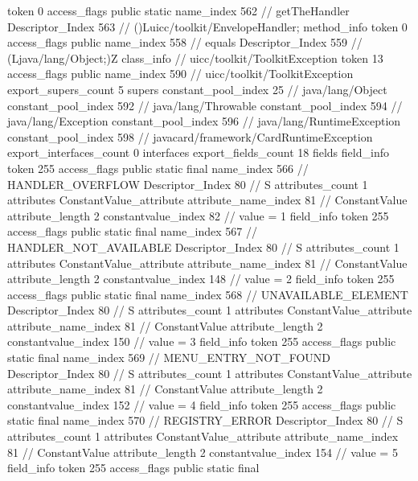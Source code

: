 {{{{{					token	0
					access_flags	public static
					name_index	562		// getTheHandler
					Descriptor_Index	563		// ()Luicc/toolkit/EnvelopeHandler;
				}
				method_info {
					token	0
					access_flags	public
					name_index	558		// equals
					Descriptor_Index	559		// (Ljava/lang/Object;)Z
				}
			}
		}
		class_info {		// uicc/toolkit/ToolkitException
			token	13
			access_flags	public
			name_index	590		// uicc/toolkit/ToolkitException
			export_supers_count	5
			supers {
				constant_pool_index	25		// java/lang/Object
				constant_pool_index	592		// java/lang/Throwable
				constant_pool_index	594		// java/lang/Exception
				constant_pool_index	596		// java/lang/RuntimeException
				constant_pool_index	598		// javacard/framework/CardRuntimeException
			}
			export_interfaces_count	0
			interfaces {
			}
			export_fields_count	18
			fields {
			field_info {
				token	255
				access_flags	public static final
				name_index	566		// HANDLER_OVERFLOW
				Descriptor_Index	80		// S
				attributes_count	1
				attributes {
				ConstantValue_attribute {
					attribute_name_index	81		// ConstantValue
					attribute_length	2
					constantvalue_index	82		// value = 1
				}
				}
			}
			field_info {
				token	255
				access_flags	public static final
				name_index	567		// HANDLER_NOT_AVAILABLE
				Descriptor_Index	80		// S
				attributes_count	1
				attributes {
				ConstantValue_attribute {
					attribute_name_index	81		// ConstantValue
					attribute_length	2
					constantvalue_index	148		// value = 2
				}
				}
			}
			field_info {
				token	255
				access_flags	public static final
				name_index	568		// UNAVAILABLE_ELEMENT
				Descriptor_Index	80		// S
				attributes_count	1
				attributes {
				ConstantValue_attribute {
					attribute_name_index	81		// ConstantValue
					attribute_length	2
					constantvalue_index	150		// value = 3
				}
				}
			}
			field_info {
				token	255
				access_flags	public static final
				name_index	569		// MENU_ENTRY_NOT_FOUND
				Descriptor_Index	80		// S
				attributes_count	1
				attributes {
				ConstantValue_attribute {
					attribute_name_index	81		// ConstantValue
					attribute_length	2
					constantvalue_index	152		// value = 4
				}
				}
			}
			field_info {
				token	255
				access_flags	public static final
				name_index	570		// REGISTRY_ERROR
				Descriptor_Index	80		// S
				attributes_count	1
				attributes {
				ConstantValue_attribute {
					attribute_name_index	81		// ConstantValue
					attribute_length	2
					constantvalue_index	154		// value = 5
				}
				}
			}
			field_info {
				token	255
				access_flags	public static final
}}}}}
